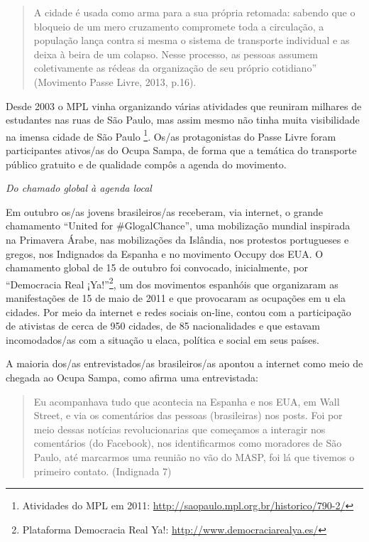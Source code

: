 \begin{quote}
A cidade é usada como arma para a sua própria retomada: sabendo que o
bloqueio de um mero cruzamento compromete toda a circulação, a população
lança contra si mesma o sistema de transporte individual e as deixa à
beira de um colapso. Nesse processo, as pessoas assumem coletivamente as
rédeas da organização de seu próprio cotidiano'' (Movimento Passe Livre,
2013, p.16).
\end{quote}

Desde 2003 o MPL vinha organizando várias atividades que reuniram
milhares de estudantes nas ruas de São Paulo, mas assim mesmo não tinha
muita visibilidade na imensa cidade de São Paulo \footnote{Atividades do
  MPL em 2011: \url{http://saopaulo.mpl.org.br/historico/790-2/}}. Os/as
protagonistas do Passe Livre foram participantes ativos/as do Ocupa
Sampa, de forma que a temática do transporte público gratuito e de
qualidade compôs a agenda do movimento.

\emph{Do chamado global à agenda local}

Em outubro os/as jovens brasileiros/as receberam, via internet, o grande
chamamento ``United for \#GlogalChance'', uma mobilização mundial
inspirada na Primavera Árabe, nas mobilizações da Islândia, nos
protestos portugueses e gregos, nos Indignados da Espanha e no movimento
Occupy dos EUA. O chamamento global de 15 de outubro foi convocado,
inicialmente, por ``Democracia Real ¡Ya!''\footnote{Plataforma
  Democracia Real Ya!: \url{http://www.democraciarealya.es/}}, um dos
movimentos espanhóis que organizaram as manifestações de 15 de maio de
2011 e que provocaram as ocupações em u ela cidades. Por meio da
internet e redes sociais on-line, contou com a participação de ativistas
de cerca de 950 cidades, de 85 nacionalidades e que estavam
incomodados/as com a situação u elaca, política e social em seus países.

A maioria dos/as entrevistados/as brasileiros/as apontou a internet como
meio de chegada ao Ocupa Sampa, como afirma uma entrevistada:

\begin{quote}
Eu acompanhava tudo que acontecia na Espanha e nos EUA, em Wall Street,
e via os comentários das pessoas (brasileiras) nos posts. Foi por meio
dessas notícias revolucionarias que começamos a interagir nos
comentários (do Facebook), nos identificarmos como moradores de São
Paulo, até marcarmos uma reunião no vão do MASP, foi lá que tivemos o
primeiro contato. (Indignada 7)
\end{quote}

